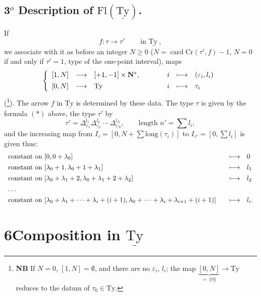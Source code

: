 \documentclass[11pt]{article}
\newcommand{\printedpage}[1]{\marginpar{\footnotesize p.~#1}}
\newcommand{\msp}[1]{\marginpar{\footnotesize [#1]}}
\newcommand{\Ty}{\mathrm{Ty}}
\newcommand{\uTy}{\underline{\mathrm{Ty}}}
\begin{document}
\subsection*{3$^o$ Description of $\mathrm{Fl}(\uTy)$.}

If
\[
f : \tau \longrightarrow \tau' \qquad \ \text{in } \uTy\ ,
\]
we associate with it as before an integer \underline{$N \geq 0$} ($N = \operatorname{card}\mathrm{Cr}(\tau', f){-}1$, $N = 0$ if and only if $\tau' = 1$, type of the one-point interval), maps
\[
\left\{
\begin{array}{lcl@{\qquad\qquad}ccl}
{[1,N]} & \longrightarrow & [+1,-1] \times \mathbf{N}^*, & i & \longmapsto & (\varepsilon_i, l_i) \\[1ex]
{[0,N]} & \longrightarrow & \Ty & i & \longmapsto & \tau_i
\end{array}
\right.
\]
(\footnote[14]{\textbf{NB} If $N = 0$, $[1,N] = \emptyset$, and there are no $\varepsilon_i$, $l_i$; the map $\underbrace{[0,N]}_{=\,\{0\}} \longrightarrow \Ty$ reduces to the datum of $\tau_0 \in \Ty$.}). The arrow $f$ in $\uTy$ is determined by these data. The type $\tau$ is given by the formula $(*)$ above, the type $\tau'$ by %
\[
\tau' = \Delta^{l_1}_{\varepsilon_1} \Delta^{l_2}_{\varepsilon_2}\ \cdots\ \Delta^{l_N}_{\varepsilon_N}, \qquad \text{length } n' = \textstyle\sum l_i, \tag*{$(*')$}
\]
\printedpage{31}
and the increasing map from $I_\tau = [0, N + \sum \mathrm{long}(\tau_i)]$ to $I_{\tau'} = [0, \sum l_i]$ is given thus:
\[
\begin{array}{l@{\qquad}cl}
\text{constant on } [0, 0+\lambda_0] & \longmapsto & 0 \\[1ex]
\text{constant on } [\lambda_0+1, \lambda_0+1+\lambda_1] & \longmapsto & l_1 \\[1ex]
\text{constant on } [\lambda_0+\lambda_1+2, \lambda_0+\lambda_1+2+\lambda_2] & \longmapsto & l_2 \\[1ex]
\ldots & & \\[1ex]
\text{constant on } [\lambda_0+\lambda_1+\cdots+\lambda_i+(i+1), \lambda_0+\cdots+\lambda_i+\lambda_{i+1}+(i+1)] & \longmapsto & l_i.
\end{array}
\]

\printedpage{32}
\msp{page 48}

\section*{6\quad Composition in $\uTy$}
\end{document}
